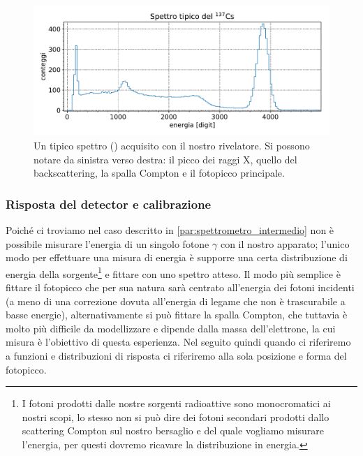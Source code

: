  \begin{figure}[h]
	\centering
	\includegraphics[width=\textwidth]{spettro_tipico}
	\caption{\label{fig:spettro_tipico}Un tipico spettro (\cs) acquisito con il nostro rivelatore. Si possono notare da sinistra verso destra: il picco dei raggi X, quello del backscattering, la spalla Compton e il fotopicco principale.}
\end{figure}

 \subsubsection{Risposta del detector e calibrazione}
 Poiché ci troviamo nel caso descritto in \autoref{par:spettrometro_intermedio} non è possibile misurare l'energia di un singolo fotone $\gamma$ con il nostro apparato; l'unico modo per effettuare una misura di energia è supporre una certa distribuzione di energia della sorgente\footnote{I fotoni prodotti dalle nostre sorgenti radioattive sono monocromatici ai nostri scopi, lo stesso non si può dire dei fotoni secondari prodotti dallo scattering Compton sul nostro bersaglio e del quale vogliamo misurare l'energia, per questi dovremo ricavare la distribuzione in energia.} e fittare con uno spettro atteso.
 Il modo più semplice è fittare il fotopicco che per sua natura sarà centrato all'energia dei fotoni incidenti (a meno di una correzione dovuta all'energia di legame che non è trascurabile a basse energie), alternativamente si può fittare la spalla Compton, che tuttavia è molto più difficile da modellizzare e dipende dalla massa dell'elettrone, la cui misura è l'obiettivo di questa esperienza. Nel seguito quindi quando ci riferiremo a funzioni e distribuzioni di risposta ci riferiremo alla sola posizione e forma del fotopicco.


